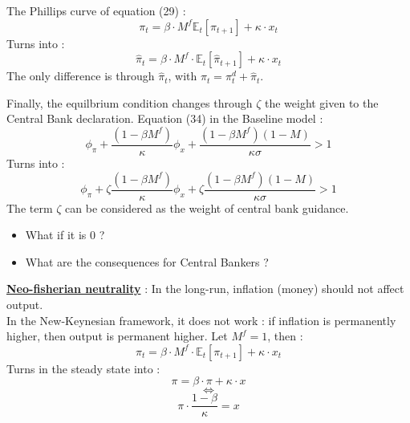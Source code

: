 \documentclass{beamer}
\begin{document}
\begin{frame}{\subsecname}
    The Phillips curve of equation (29) :
    \begin{equation}\tag{29}
        \pi_{t}=\beta\cdot M^{f} \mathbb{E}_{t}\left[\pi_{t+1}\right]+\kappa\cdot x_{t}
    \end{equation}
    Turns into :
    \begin{equation}\tag{61}
        \hat{\pi}_{t}=\beta\cdot M^{f}\cdot\mathbb{E}_t\left[\hat{\pi}_{t+1}\right]+\kappa\cdot x_{t}
    \end{equation}
    The only difference is through $\hat{\pi}_{t}$, with ${\pi}_{t}=\pi^{d}_{t}+\hat{\pi}_{t}$.
\end{frame}

\begin{frame}{\subsecname}
    Finally, the equilbrium condition changes through $\zeta$ the weight given to the Central Bank declaration. 
    Equation (34) in the Baseline model :
    \begin{equation}\tag{34}
        \phi_{\pi}+\frac{(1-\beta M^{f})}{\kappa}\phi_{x}+\frac{(1-\beta M^{f})(1-M)}{\kappa\sigma}>1
    \end{equation}
    Turns into :
    \begin{equation}\tag{62}
        \phi_{\pi}+\zeta \frac{(1-\beta M^{f})}{\kappa}\phi_{x}+\zeta\frac{(1-\beta M^{f})(1-M)}{\kappa \sigma}>1
    \end{equation}
    The term $\zeta$ can be considered as the weight of central bank guidance.
    \begin{itemize}
        \item What if it is 0 ?
        \item What are the consequences for Central Bankers ?
    \end{itemize}
\end{frame}

\begin{frame}{\subsecname}
    \textbf{\underline{Neo-fisherian neutrality}} : In the long-run, inflation (money) should not affect output. \\
    In the New-Keynesian framework, it does not work : if inflation is permanently higher, then output is permanent higher.
    Let $M^{f}=1$, then :
    \begin{equation}\tag{29}
        \pi_{t}=\beta\cdot M^{f}\cdot\mathbb{E}_{t}\left[\pi_{t+1}\right]+\kappa\cdot x_{t}
    \end{equation}
    Turns in the steady state into :
    \begin{equation*}
        \pi=\beta\cdot\pi+\kappa\cdot x
    \end{equation*}
    $$\iff$$
    \begin{equation*}
        \pi\cdot\frac{1-\beta}{\kappa}= x
    \end{equation*}
\end{frame}
\end{document}
